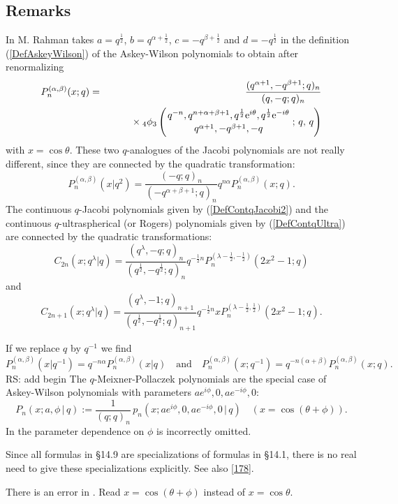\documentclass[envcountchap,graybox]{svmono}
\newcommand{\qhyp}[5]{\mbox{}_{#1}{\phi}_{#2}
\left(\genfrac{}{}{0pt}{}{#3}{#4}\,;\,q,\,#5\right)}
\newcommand{\mathindent}{\hspace{7.5mm}}
\newcommand{\e}{\textrm{e}}
\newcommand\tha\theta
\newcommand{\qhyp}[5]{\,\mbox{}_{#1}\phi_{#2}\!\left(
  \genfrac{}{}{0pt}{}{#3}{#4};#5\right)}
\begin{document}
\subsection*{Remarks} 
In \cite{Rahman81IV} M. Rahman takes
$a=q^{\frac{1}{2}}$, $b=q^{\alpha+\frac{1}{2}}$, $c=-q^{\beta+\frac{1}{2}}$ and
$d=-q^{\frac{1}{2}}$ in the definition (\ref{DefAskeyWilson}) of the
Askey-Wilson polynomials to obtain after renormalizing
\begin{eqnarray}
\label{DefContqJacobi2}
P_n^{(\alpha,\beta)}(x;q)&=&\frac{(q^{\alpha+1},-q^{\beta+1};q)_n}{(q,-q;q)_n}\nonumber\\
& &{}\mathindent{}\times
\qhyp{4}{3}{q^{-n},q^{n+\alpha+\beta+1},q^{\frac{1}{2}}\e^{i\theta},q^{\frac{1}{2}}\e^{-i\theta}}
{q^{\alpha+1},-q^{\beta+1},-q}{q}
\end{eqnarray}
with $x=\cos\theta$. These two $q$-analogues of the Jacobi polynomials are not really
different, since they are connected by the quadratic transformation:
$$P_n^{(\alpha,\beta)}(x|q^2)=\frac{(-q;q)_n}{(-q^{\alpha+\beta+1};q)_n}q^{n\alpha}P_n^{(\alpha,\beta)}(x;q).$$
The continuous $q$-Jacobi polynomials given by (\ref{DefContqJacobi2}) and
the continuous $q$-ultra\-spher\-ical (or Rogers) polynomials given by
(\ref{DefContqUltra}) are connected by the quadratic transformations:
$$C_{2n}(x;q^{\lambda}|q)=\frac{(q^{\lambda},-q;q)_n}
{(q^{\frac{1}{2}},-q^{\frac{1}{2}};q)_n}q^{-\frac{1}{2}n}
P_n^{(\lambda-\frac{1}{2},-\frac{1}{2})}(2x^2-1;q)$$
and
$$C_{2n+1}(x;q^{\lambda}|q)=\frac{(q^{\lambda},-1;q)_{n+1}}
{(q^{\frac{1}{2}},-q^{\frac{1}{2}};q)_{n+1}}q^{-\frac{1}{2}n}
xP_n^{(\lambda-\frac{1}{2},\frac{1}{2})}(2x^2-1;q).$$

\noindent
If we replace $q$ by $q^{-1}$ we find
$$P_n^{(\alpha,\beta)}(x|q^{-1})=q^{-n\alpha}P_n^{(\alpha,\beta)}(x|q)\quad\textrm{and}\quad
P_n^{(\alpha,\beta)}(x;q^{-1})=q^{-n(\alpha+\beta)}P_n^{(\alpha,\beta)}(x;q).$$
 RS: add begin\label{sec14.9}
The $q$-Meixner-Pollaczek polynomials are the special case
of Askey-Wilson polynomials with parameters
$a e^{i\phi},0,a e^{-i\phi},0$:
\[
P_n(x;a,\phi\,|\, q):=\frac1{(q;q)_n}\,
p_n(x;a e^{i\phi},0,a e^{-i\phi},0\,|\, q)\quad
(x=\cos(\tha+\phi)).
\]
In  the parameter dependence on $\phi$ is
incorrectly omitted.

Since all formulas in \S14.9 are specializations of formulas in \S14.1,
there is no real need to give these specializations explicitly.
See also \eqref{178}.

There is an error in .
Read $x=\cos(\tha+\phi)$ instead of $x=\cos\tha$.
%
\end{document}
